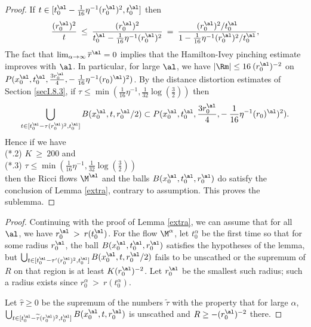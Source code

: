\begin{proof}
If $t \in [t_0^\al - \frac{1}{16} \eta^{-1} (r_0^\al)^2, t_0^\al]$ then
\begin{equation}
\frac{(r_0^\al)^2}{t} \: \le \:
\frac{(r_0^\al)^2}{t_0^\al - \frac{1}{16} \eta^{-1} (r_0^\al)^2} \: = \:
\frac{(r_0^\al)^2/t_0^\al}{1 - \frac{1}{16} \eta^{-1} (r_0^\al)^2/t_0^\al},
\end{equation}
The fact that $\lim_{\alpha \rightarrow \infty} \overline{r}^\al = 0$
implies that the Hamilton-Ivey pinching estimate improves with $\al$.
In particular, for large $\al$, we have $|\Rm| \le
16 \: (r_0^\al)^{-2}$ on
$P(x^\al_0, t^\al_0,  \frac{3r_0^\al}{4},
- \: \frac{1}{16} \eta^{-1} (r_0)^\al)^2)$.
By the distance distortion estimates of Section \ref{secI.8.3},
if $\tau \le \min \left( \frac{1}{16} \eta^{-1},
\frac{1}{32} \log(\frac32) \right)$ then
\begin{equation}
\bigcup_{t \in [t_0^\al -\tau (r^\al_0)^2, t^\al_0]}
B(x^\al_0, t, r^\al_0/2) \subset P(x^\al_0, t^\al_0,  \frac{3r_0^\al}{4},
- \: \frac{1}{16} \eta^{-1} (r_0)^\al)^2).
\end{equation}
Hence if we have \\
(*.2) $K \: \ge \: 200$ and \\
(*.3) $\tau \le \min \left( \frac{1}{16} \eta^{-1},
\frac{1}{32} \log(\frac32) \right)$\\
then the Ricci flows $\M^\al$ and the balls
$B(x_0^\al, t_0^\al, r_0^\al)$ do satisfy the conclusion of
Lemma \ref{extra}, contrary to assumption. This proves the
sublemma.
\end{proof}
\begin{proof}

Continuing with the proof of Lemma \ref{extra}, we can assume that
for all $\al$, we have $r_0^\al \: > \: r(t_0^\al)$.
For the flow $\M^\alpha$,
let $t_0^\alpha$ be the first time so that for some radius $r_0^\al$,
the ball $B(x_0^\al, t_0^\al, r_0^\al)$ satisfies the hypotheses of the
lemma, but
$\bigcup_{t \in [t_0^\al -\tau^\prime (r^\al_0)^2, t^\al_0]}
B(x^\al_0, t, r^\al_0/2)$ fails to be unscathed or the
supremum of $R$ on that region is at least
$K (r_0^\al)^{-2}$.
Let $r_0^\al$ be the smallest such radius;
such a radius exists since
$r_0^\alpha \: > \: r(t_0^\alpha)$.

Let
$\widehat{\tau}\geq 0$
be the supremum of the numbers $\widetilde{\tau}$
with the property that for large $\alpha$,
$\bigcup_{t \in [t_0^\al -\widetilde{\tau} (r^\al_0)^2, t^\al_0]}
B(x^\al_0, t, r^\al_0)$ is unscathed and
$R \ge - (r_0^\al)^{-2}$ there.

\end{proof}
